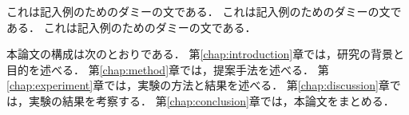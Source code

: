 
これは記入例のためのダミーの文である．
これは記入例のためのダミーの文である．
これは記入例のためのダミーの文である．

本論文の構成は次のとおりである．
第\ref{chap:introduction}章では，研究の背景と目的を述べる．
第\ref{chap:method}章では，提案手法を述べる．
第\ref{chap:experiment}章では，実験の方法と結果を述べる．
第\ref{chap:discussion}章では，実験の結果を考察する．
第\ref{chap:conclusion}章では，本論文をまとめる．
